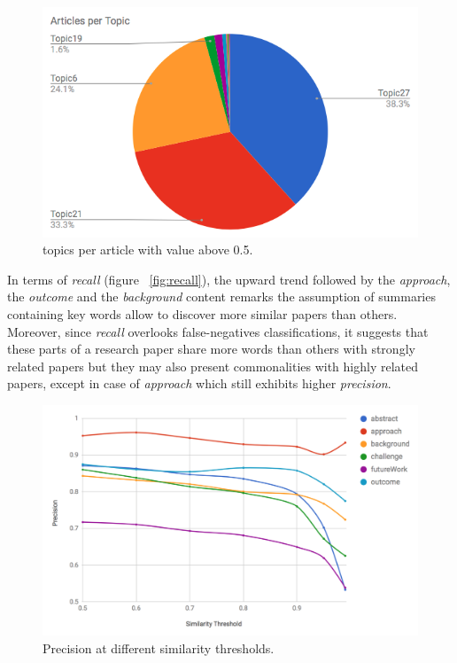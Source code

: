 \begin{figure}[!htbp]
  \center
  \includegraphics[scale=0.4]{articlesTopic.png}
  \caption{topics per article with value above 0.5.}
  \label{fig:articleTopics}
\end{figure}


In terms of \textit{recall} (figure ~\ref{fig:recall}), the upward trend followed by the \textit{approach}, the \textit{outcome} and the \textit{background} content remarks the assumption of summaries containing key words allow to discover more similar papers than others. Moreover, since \textit{recall} overlooks false-negatives classifications, it suggests that these parts of a research paper share more words than others with strongly related papers but they may also present commonalities with highly related papers, except in case of \textit{approach} which still exhibits higher \textit{precision}.

\begin{figure}[!htbp]
  \center
  \includegraphics[scale=0.4]{precision.png}
  \caption{Precision at different similarity thresholds.}
  \label{fig:precision}
\end{figure}


